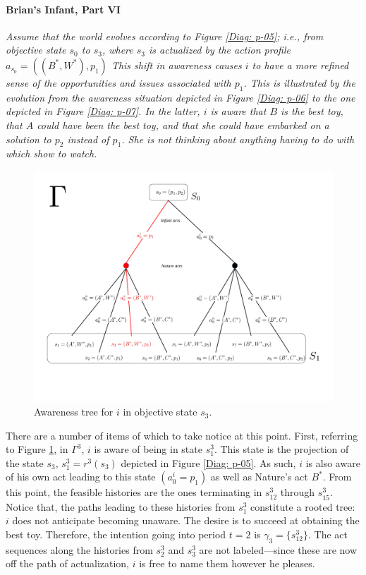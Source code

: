 \documentclass[
11pt,
titlepage,
reqno,
]{article}%
\theoremstyle{definition}
\begin{document}
\paragraph{Brian's Infant, Part VI}
{\em
Assume that the world evolves according to Figure \ref{Diag: p-05}; i.e., from objective state $s_0$ to $s_{3}$, where $s_{3}$ is actualized by the action profile $a_{s_0}=((B^\ast,W^\ast),p_1)$
This shift in awareness causes $i$ to have a more refined sense of the opportunities and issues associated with $p_1$.
This is illustrated by the evolution from the awareness situation depicted in Figure \ref{Diag: p-06} to the one depicted in Figure \ref{Diag: p-07}. 
In the latter, $i$ is aware that $B$ is the best toy, that $A$ could have been the best toy, and that she could have embarked on a solution to $p_2$ instead of $p_1$. 
She is not thinking about anything having to do with which show to watch.

\begin{figure}[h!]
	\centering
	\includegraphics*[page=8,trim = 0in 0in 1in 0in,scale=.7]{Awareness_Diagrams_All}
	\caption{Awareness tree for $i$ in objective state $s_{3}$.\label{Diag: p-08}}%
\end{figure}

There are a number of items of which to take notice at this point.
First, referring to Figure \ref{Diag: p-08}, in $\Gamma^{3} $, $i$ is aware of being in state $s^{3}_{1}$.
This state is the projection of the state  $s_{3}$, $s^{3}_{1}=r^{3}(s_{3})$ depicted in Figure \ref{Diag: p-05}.
As such, $i$ is also aware of his own act leading to this state $(a^i_0=p_1)$ as well as Nature's act $B^\ast$.
From this point, the feasible histories are the ones terminating in $s^{3}_{12}$ through $s^{3}_{15}$.
Notice that, the paths leading to these histories from  $s^{3}_{1}$ constitute a rooted tree: $i$ does not anticipate becoming unaware.
The desire is to succeed at obtaining the best toy.
Therefore, the intention going into period $t=2$ is $\gamma_{3}=\{s^{3}_{12}\}$.
The act sequences along the histories from $s^{3}_{2}$ and $s^{3}_{3}$ are not labeled---since these are now off the path of actualization, $i$ is free to name them however he pleases.
}
\end{document}
